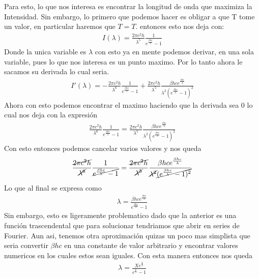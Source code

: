 \documentclass[12pt]{exam}
\begin{document}
\begin{enumerate}
\begin{itemize}
				Para esto, lo que nos interesa es encontrar la longitud de onda que maximiza la Intensidad. Sin embargo, lo primero que podemos hacer es obligar a que T tome un valor, en particular haremos que $T = T$. entonces esto nos deja con:
				\begin{align*}
					I(\lambda) = \frac{2\pi c^2h}{\lambda^5}\frac{1}{e^{\frac{\beta hc}{\lambda}}-1}
				\end{align*}
				Donde la unica variable es $\lambda$ con esto ya en mente podemos derivar, en una sola variable, pues lo que nos interesa es un punto maximo. Por lo tanto ahora le sacamos su derivada lo cual seria.
				\begin{align*}
					I'(\lambda) = -\frac{2\pi c^2 h}{\lambda^6}\frac{1}{e^{\frac{\beta hc}{\lambda}}-1}+\frac{2\pi c^2h}{\lambda^5}\frac{\beta hc e^{\frac{\beta hc}{\lambda}}}{\lambda^2(e^{\frac{\beta hc}{\lambda}}-1)^2}
				\end{align*}
				Ahora con esto podemos encontrar el maximo haciendo que la derivada sea 0 lo cual nos deja con la expresión
				\begin{align*}
					\frac{2\pi c^2h}{\lambda^6}\frac{1}{e^{\frac{\beta hc}{\lambda}}-1}=\frac{2\pi c^2h}{\lambda^5}\frac{\beta hc e^{\frac{\beta hc}{\lambda}}}{\lambda^2(e^{\frac{\beta hc}{\lambda}}-1)^2}
				\end{align*}
		Con esto entonces podemos cancelar varios valores y nos queda
		\begin{align*}
			\frac{\cancel{2\pi c^2h}}{\cancel{\lambda^6}}\frac{1}{\cancel{e^{\frac{\beta hc}{\lambda}}-1}}=\frac{\cancel{2\pi c^2h}}{\cancel{\lambda^5}}\frac{\beta hc e^{\frac{\beta hc}{\lambda}}}{\cancel{\lambda^2}\cancel{(e^{\frac{\beta hc}{\lambda}}-1)^2}}
		\end{align*}
		Lo que al final se expresa como
		\begin{align*}
			\lambda = \frac{\beta hce^{\frac{\beta hc}{\lambda}}}{e^{\frac{\beta hc}{\lambda}}-1}
		\end{align*}
		Sin embargo, esto es ligeramente problematico dado que la anterior es una función trascendental que para solucionar tendriamos que abrir en series de Fourier. Aun asi, tenemos otra aproximación quizas un poco mas simplista que seria convertir $\beta hc$ en una constante de valor arbitrario y encontrar valores numericos en los cuales estos sean iguales. Con esta manera entonces nos queda
				\begin{align*}
					\lambda = \frac{X e^{\frac{x}{\lambda}}}{e^{\frac{x}{\lambda}}-1}
				\end{align*}
				

\end{itemize}
\end{enumerate}
\end{document}

